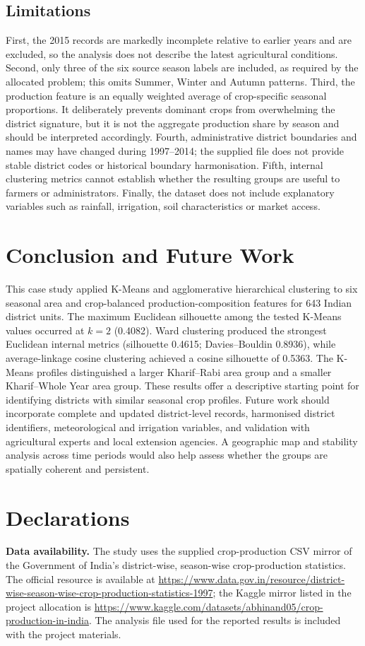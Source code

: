 \documentclass[9pt,a4paper,twocolumn]{extarticle}
\newcommand{\smallurl}[1]{\url{#1}}
\begin{document}
\subsection{Limitations}
First, the 2015 records are markedly incomplete relative to earlier years and are excluded, so the analysis does not describe the latest agricultural conditions. Second, only three of the six source season labels are included, as required by the allocated problem; this omits Summer, Winter and Autumn patterns. Third, the production feature is an equally weighted average of crop-specific seasonal proportions. It deliberately prevents dominant crops from overwhelming the district signature, but it is not the aggregate production share by season and should be interpreted accordingly. Fourth, administrative district boundaries and names may have changed during 1997--2014; the supplied file does not provide stable district codes or historical boundary harmonisation. Fifth, internal clustering metrics cannot establish whether the resulting groups are useful to farmers or administrators. Finally, the dataset does not include explanatory variables such as rainfall, irrigation, soil characteristics or market access.

\section{Conclusion and Future Work}
This case study applied K-Means and agglomerative hierarchical clustering to six seasonal area and crop-balanced production-composition features for 643 Indian district units. The maximum Euclidean silhouette among the tested K-Means values occurred at $k=2$ (0.4082). Ward clustering produced the strongest Euclidean internal metrics (silhouette 0.4615; Davies--Bouldin 0.8936), while average-linkage cosine clustering achieved a cosine silhouette of 0.5363. The K-Means profiles distinguished a larger Kharif--Rabi area group and a smaller Kharif--Whole Year area group. These results offer a descriptive starting point for identifying districts with similar seasonal crop profiles. Future work should incorporate complete and updated district-level records, harmonised district identifiers, meteorological and irrigation variables, and validation with agricultural experts and local extension agencies. A geographic map and stability analysis across time periods would also help assess whether the groups are spatially coherent and persistent.

\section*{Declarations}
\noindent\textbf{Data availability.} The study uses the supplied crop-production CSV mirror of the Government of India's district-wise, season-wise crop-production statistics. The official resource is available at \smallurl{https://www.data.gov.in/resource/district-wise-season-wise-crop-production-statistics-1997}; the Kaggle mirror listed in the project allocation is \smallurl{https://www.kaggle.com/datasets/abhinand05/crop-production-in-india}. The analysis file used for the reported results is included with the project materials.
\end{document}
